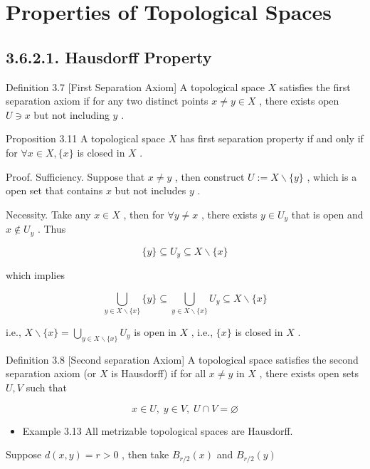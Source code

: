 \chapter{Properties of Topological Spaces}

\section*{3.6.2.1. Hausdorff Property}

Definition 3.7 [First Separation Axiom] A topological space \(X\) satisfies the first separation axiom if for any two distinct points \(x \neq  y \in  X\) , there exists open \(U \ni  x\) but not including \(y\) .

Proposition 3.11 A topological space \(X\) has first separation property if and only if for \(\forall x \in  X,\{ x\}\) is closed in \(X\) .

Proof. Sufficiency. Suppose that \(x \neq  y\) , then construct \(U \mathrel{\text{ := }} X \smallsetminus  \{ y\}\) , which is a open set that contains \(x\) but not includes \(y\) .

Necessity. Take any \(x \in  X\) , then for \(\forall y \neq  x\) , there exists \(y \in  {U}_{y}\) that is open and \(x \notin  {U}_{y}\) . Thus

\[
\{ y\}  \subseteq  {U}_{y} \subseteq  X \smallsetminus  \{ x\}
\]

which implies

\[
\mathop{\bigcup }\limits_{{y \in  X \smallsetminus  \{ x\} }}\{ y\}  \subseteq  \mathop{\bigcup }\limits_{{y \in  X \smallsetminus  \{ x\} }}{U}_{y} \subseteq  X \smallsetminus  \{ x\}
\]

i.e., \(X \smallsetminus  \{ x\}  = \mathop{\bigcup }\limits_{{y \in  X\smallsetminus \{ x\} }}{U}_{y}\) is open in \(X\) , i.e., \(\{ x\}\) is closed in \(X\) .

Definition 3.8 [Second separation Axiom] A topological space satisfies the second separation axiom (or \(X\) is Hausdorff) if for all \(x \neq  y\) in \(X\) , there exists open sets \(U,V\) such that

\[
x \in  U,\;y \in  V,\;U \cap  V = \varnothing
\]

\begin{itemize}
\item Example 3.13 All metrizable topological spaces are Hausdorff.
\end{itemize}

Suppose \(d\left( {x,y}\right)  = r > 0\) , then take \({B}_{r/2}\left( x\right)\) and \({B}_{r/2}\left( y\right)\)

